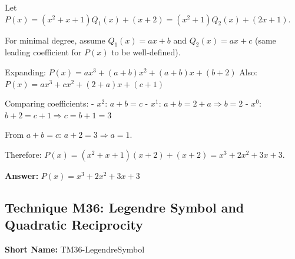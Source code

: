 \documentclass[12pt]{article}
\newenvironment{solution}
{\begin{tcolorbox}[colback=green!5!white,colframe=green!75!black,title={Solution}]}{\end{tcolorbox}}
\begin{document}
\begin{solution}
Let $P(x) = (x^2+x+1)Q_1(x) + (x+2) = (x^2+1)Q_2(x) + (2x+1)$.

For minimal degree, assume $Q_1(x) = ax+b$ and $Q_2(x) = ax+c$ (same leading coefficient for $P(x)$ to be well-defined).

Expanding: $P(x) = ax^3 + (a+b)x^2 + (a+b)x + (b+2)$
Also: $P(x) = ax^3 + cx^2 + (2+a)x + (c+1)$

Comparing coefficients:
- $x^2$: $a+b = c$ 
- $x^1$: $a+b = 2+a \Rightarrow b = 2$
- $x^0$: $b+2 = c+1 \Rightarrow c = b+1 = 3$

From $a+b = c$: $a+2 = 3 \Rightarrow a = 1$.

Therefore: $P(x) = (x^2+x+1)(x+2) + (x+2) = x^3+2x^2+3x+3$.

\textbf{Answer:} $P(x) = x^3+2x^2+3x+3$
\end{solution}

\subsection{Technique M36: Legendre Symbol and Quadratic Reciprocity}
\textbf{Short Name:} TM36-LegendreSymbol
\end{document}

